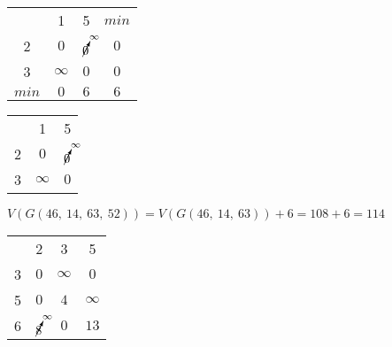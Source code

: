 \begin{itemize}
	\begin{table}[H]
	\begin{center}
		\def\tabcolsep{18pt}
		\def\arraystretch{1.5}
		\fontsize{13}{14}\selectfont
		\begin{tabular}{|c||c|c||c|}
			\hline 
	  		& 1 & 5 & $min$\\ 
			\hhline{|=#=|=#=|} 
			2 & $0$ & $\cancelto{\infty}{0}$ & $0$ \\ 
			\hline 
			3 & $\infty$ & $0$ & $0$ \\ 
			\hhline{|=#=|=#=|}
			$min$ & $0$ & $6$ & $6$ \\
			\hline
		\end{tabular}  
	\end{center}
	\end{table}

	\begin{table}[H]
	\begin{center}
		\def\tabcolsep{18pt}
		\def\arraystretch{1.5}
		\fontsize{13}{14}\selectfont
		\begin{tabular}{|c||c|c|}
			\hline 
	  		& 1 & 5\\ 
			\hhline{|=#=|=|} 
			2 & $0$ & $\cancelto{\infty}{0}$ \\ 
			\hline 
			3 & $\infty$ & $0$ \\ 
			\hline
		\end{tabular}  
	\end{center}
	\end{table}

	$V(G(46,\ 14,\ 63,\ 52)) = V(G(46,\ 14,\  63)) + 6 = 108 + 6 = 114$\\
	
\end{itemize}

\begin{table}[H]
\begin{center}
	\def\tabcolsep{18pt}
	\def\arraystretch{1.5}
	\fontsize{13}{14}\selectfont
	\begin{tabular}{|c||c|c|c|}
		\hline 
	  	& 2 & 3 & 5 \\ 
		\hhline{|=#=|=|=|} 
		3 & $0$ & $\infty$ & $0$ \\ 
		\hline 
		5 & $0$ & $4$ & $\infty$ \\ 
		\hline 
		6 & $\cancelto{\infty}{8}$ & $0$ & $13$ \\
		\hline
	\end{tabular}  
\end{center}
\end{table}

